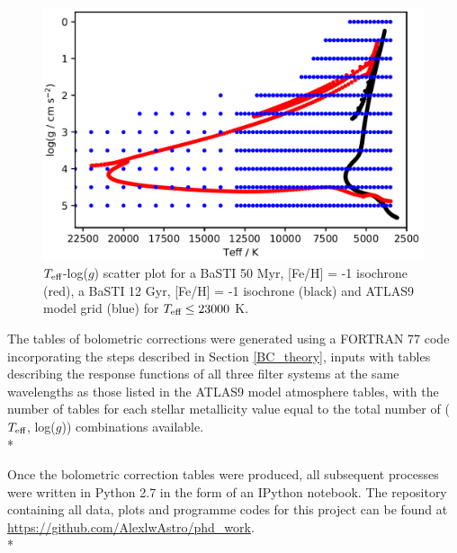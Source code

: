 \documentclass[12pt, a4paper]{report}
\begin{document}
\begin{figure}[h]
\begin{center}
\includegraphics[scale=0.6]{ATLAS9_grid_BaSTI_coverage_2ages_crop.png}
\caption{$T_{\textnormal{eff}}$-log($g$) scatter plot for a BaSTI 50 Myr, [Fe/H] = -1 isochrone (red), a BaSTI 12 Gyr, [Fe/H] = -1 isochrone (black) and ATLAS9 model grid (blue) for $T_{\textnormal{eff}} \leq 23000$ K.}
\label{Teff-logg coverage}
\end{center}
\end{figure}

The tables of bolometric corrections were generated using a FORTRAN 77 code incorporating the steps described in Section \ref{BC_theory}, inputs with tables describing the response functions of all three filter systems at the same wavelengths as those listed in the ATLAS9 model atmosphere tables, with the number of tables for each stellar metallicity value equal to the total number of ($T_{\textnormal{eff}}$, log($g$)) combinations available.\\*

Once the bolometric correction tables were produced, all subsequent processes were written in Python 2.7 in the form of an IPython notebook. The repository containing all data, plots and programme codes for this project can be found at \protect\url{https://github.com/AlexlwAstro/phd_work}.\\*
\end{document}
